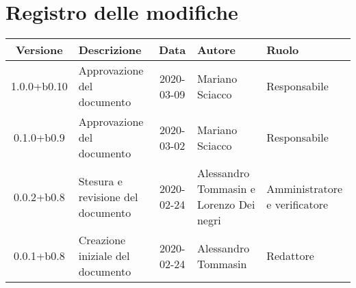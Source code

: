 \section*{Registro delle modifiche}

\begin{center}
	\begin{longtable}{|c|p{3.5cm}|c|p{3cm}|p{3cm}|}
	\hline
	\rowcolor{lighter-grayer}
	\textbf{Versione} & \textbf{Descrizione} & \textbf{Data} & \textbf{Autore} & \textbf{Ruolo} \\
	\hline
	\endfirsthead

	1.0.0+b0.10 & Approvazione del documento & 2020-03-09 & Mariano Sciacco & Responsabile \\
	\hline
	0.1.0+b0.9 & Approvazione del documento & 2020-03-02 & Mariano Sciacco & Responsabile \\
	\hline
	0.0.2+b0.8 & Stesura e revisione del documento & 2020-02-24 & Alessandro Tommasin e Lorenzo Dei negri & Amministratore e verificatore \\
	\hline
	0.0.1+b0.8 & Creazione iniziale del documento & 2020-02-24 & Alessandro Tommasin & Redattore \\
	\hline

	\end{longtable}
\end{center}